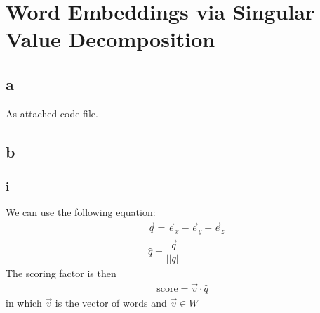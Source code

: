 

\oddsidemargin 0in
\evensidemargin 0in
\textwidth 6.5in
\topmargin -0.5in
\textheight 9.0in
\usepackage{amsmath}
\usepackage{graphicx}





\pagestyle{myheadings}  %

\section{Word Embeddings via Singular Value Decomposition}
\subsection{a}
As attached code file.
\subsection{b}
\subsubsection{i}
We can use the following equation:
\begin{align*}
& \vec{q} = \vec{e}_{x} - \vec{e}_{y} + \vec{e}_{z} \\
&\hat{q} = \dfrac{\vec{q}}{||q||}
\end{align*}
The scoring factor is then 
\begin{align*}
\text{score} = \vec{v}\cdot \hat{q}
\end{align*}
in which $\vec{v}$ is the vector of words and $\vec{v}\in W$

